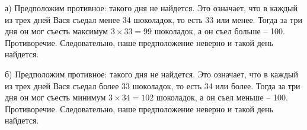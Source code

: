 \begin{prf}
	а) Предположим противное: такого дня не найдется. Это означает, что в каждый из трех дней Вася съедал менее 34 шоколадок, то есть 33 или менее. Тогда за три дня он мог съесть максимум $3\times33=99$ шоколадок, а он съел больше -- 100. Противоречие. Следовательно, наше предположение неверно и такой день найдется.
	
	б) Предположим противное: такого дня не найдется. Это означает, что в каждый из трех дней Вася съедал более 33 шоколадок, то есть 34 или более. Тогда за три дня он мог съесть минимум $3\times34=102$ шоколадок, а он съел меньше -- 100. Противоречие. Следовательно, наше предположение неверно и такой день найдется.
\end{prf}
